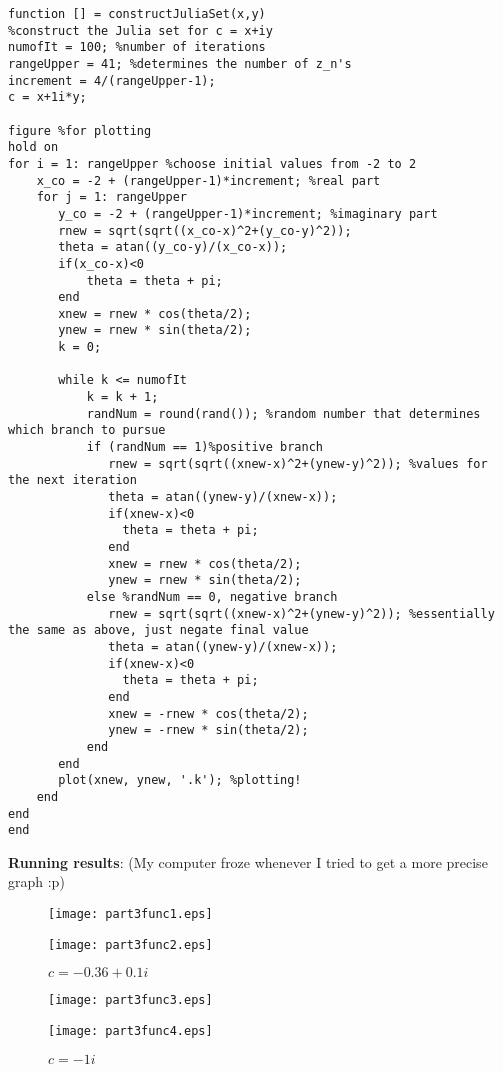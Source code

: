 \documentclass[11pt]{article}
\begin{document}
\begin{lstlisting}
function [] = constructJuliaSet(x,y)
%construct the Julia set for c = x+iy
numofIt = 100; %number of iterations
rangeUpper = 41; %determines the number of z_n's
increment = 4/(rangeUpper-1);
c = x+1i*y;

figure %for plotting
hold on
for i = 1: rangeUpper %choose initial values from -2 to 2
    x_co = -2 + (rangeUpper-1)*increment; %real part
    for j = 1: rangeUpper 
       y_co = -2 + (rangeUpper-1)*increment; %imaginary part 
       rnew = sqrt(sqrt((x_co-x)^2+(y_co-y)^2));
       theta = atan((y_co-y)/(x_co-x));
       if(x_co-x)<0
           theta = theta + pi;
       end
       xnew = rnew * cos(theta/2);
       ynew = rnew * sin(theta/2);
       k = 0;

       while k <= numofIt
           k = k + 1;
           randNum = round(rand()); %random number that determines which branch to pursue
           if (randNum == 1)%positive branch
              rnew = sqrt(sqrt((xnew-x)^2+(ynew-y)^2)); %values for the next iteration
              theta = atan((ynew-y)/(xnew-x));
              if(xnew-x)<0
                theta = theta + pi;
              end
              xnew = rnew * cos(theta/2);
              ynew = rnew * sin(theta/2);
           else %randNum == 0, negative branch
              rnew = sqrt(sqrt((xnew-x)^2+(ynew-y)^2)); %essentially the same as above, just negate final value
              theta = atan((ynew-y)/(xnew-x));
              if(xnew-x)<0
                theta = theta + pi;
              end
              xnew = -rnew * cos(theta/2);
              ynew = -rnew * sin(theta/2);
           end
       end
       plot(xnew, ynew, '.k'); %plotting!
    end   
end
end

\end{lstlisting}

\textbf{Running results}: (My computer froze whenever I tried to get a more precise graph :p)\\
\begin{figure}[H]
  \centering
  \begin{minipage}[b]{0.45\textwidth}
    \texttt{[image: part3func1.eps]}
    \caption{$c = 0$}
  \end{minipage}
  \hfill
  \begin{minipage}[b]{0.45\textwidth}
    \texttt{[image: part3func2.eps]}
    \caption{$c = -0.36 +  0.1i$}
  \end{minipage}
   \end{figure}
   
   \begin{figure}[H]
  \centering
  \begin{minipage}[b]{0.45\textwidth}
    \texttt{[image: part3func3.eps]}
    \caption{$c = -0.123 - 0.745i$}
  \end{minipage}
  \hfill
  \begin{minipage}[b]{0.45\textwidth}
    \texttt{[image: part3func4.eps]}
    \caption{$c = -1i$}
  \end{minipage}
   \end{figure}
\end{document}
